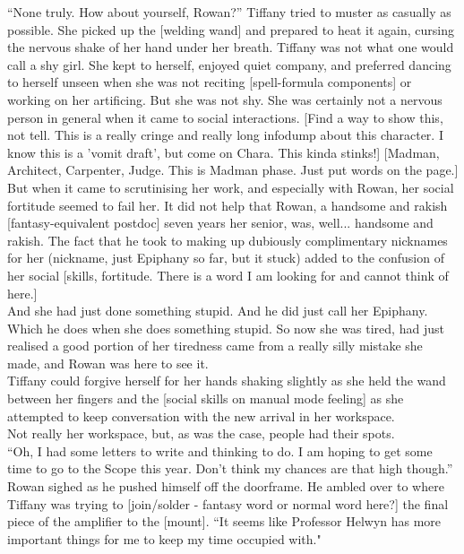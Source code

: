 ``None truly. How about yourself, Rowan?'' Tiffany tried to muster as casually as possible. 
She picked up the [welding wand] and prepared to heat it again, cursing the nervous shake of her hand under her breath.
Tiffany was not what one would call a shy girl. 
She kept to herself, enjoyed quiet company, and preferred dancing to herself unseen when she was not reciting [spell-formula components] or working on her artificing. 
But she was not shy.
She was certainly not a nervous person in general when it came to social interactions. 
[Find a way to show this, not tell. 
This is a really cringe and really long infodump about this character. 
I know this is a 'vomit draft', but come on Chara. This kinda stinks!]
[Madman, Architect, Carpenter, Judge. 
This is Madman phase. 
Just put words on the page.]\\

But when it came to scrutinising her work, and especially with Rowan, her social fortitude seemed to fail her.
It did not help that Rowan, a handsome and rakish [fantasy-equivalent postdoc] seven years her senior, was, well... handsome and rakish.
The fact that he took to making up dubiously complimentary nicknames for her (nickname, just Epiphany so far, but it stuck) added to the confusion of her social [skills, fortitude. There is a word I am looking for and cannot think of here.]\\

And she had just done something stupid.
And he did just call her Epiphany.
Which he does when she does something stupid.
So now she was tired, had just realised a good portion of her tiredness came from a really silly mistake she made, and Rowan was here to see it.\\

Tiffany could forgive herself for her hands shaking slightly as she held the wand between her fingers and the [social skills on manual mode feeling] as she attempted to keep conversation with the new arrival in her workspace.\\

Not really her workspace, but, as was the case, people had their spots.\\

``Oh, I had some letters to write and thinking to do. I am hoping to get some time to go to the Scope this year. Don't think my chances are that high though.'' 
Rowan sighed as he pushed himself off the doorframe. 
He ambled over to where Tiffany was trying to [join/solder - fantasy word or normal word here?] the final piece of the amplifier to the [mount].
``It seems like Professor Helwyn has more important things for me to keep my time occupied with."\\

